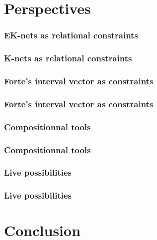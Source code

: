 \documentclass{beamer}
\begin{document}
\section{Perspectives}
\subsubsection{EK-nets as relational constraints}
\begin{frame}
	\frametitle{K-nets as relational constraints}
\end{frame}

\subsubsection{Forte's interval vector as constraints}
\begin{frame}
	\frametitle{Forte's interval vector as constraints}
\end{frame}

\subsubsection{Compositionnal tools}
\begin{frame}
	\frametitle{Compositionnal tools}
\end{frame}

\subsubsection{Live possibilities}
\begin{frame}
	\frametitle{Live possibilities}
\end{frame}


\section{Conclusion}
\end{document}
